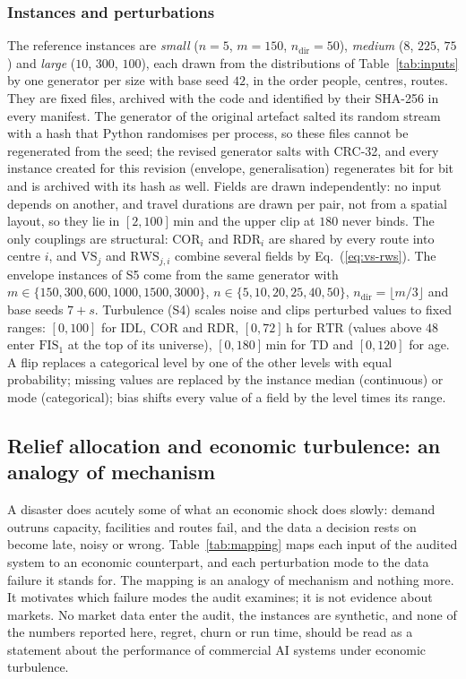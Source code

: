 \documentclass[systems,article,submit,moreauthors,pdftex]{Definitions/mdpi}
\begin{document}
\subsubsection{Instances and perturbations}
The reference instances are \emph{small} ($n=5$, $m=150$, $n_{\mathrm{dir}}=50$),
\emph{medium} ($8$, $225$, $75$) and \emph{large} ($10$, $300$, $100$), each drawn from the
distributions of Table~\ref{tab:inputs} by one generator per size with base seed $42$, in the
order people, centres, routes. They are fixed files, archived with the code and identified by
their SHA-256 in every manifest.
The generator of the original artefact salted its random stream with a hash that Python
randomises per process, so these files cannot be regenerated from the seed; the revised
generator salts with CRC-32, and every instance created for this revision (envelope,
generalisation) regenerates bit for bit and is archived with its hash as well.
Fields are drawn independently: no input
depends on another, and travel durations are drawn per pair, not from a spatial layout, so
they lie in $[2,100]$\,min and the upper clip at $180$ never binds. The only couplings are
structural: $\mathrm{COR}_i$ and $\mathrm{RDR}_i$ are shared by every route into centre $i$,
and $\mathrm{VS}_j$ and $\mathrm{RWS}_{j,i}$ combine several fields by
Eq.~(\ref{eq:vs-rws}). The envelope instances of S5 come from the same generator with
$m\in\{150,300,600,1000,1500,3000\}$, $n\in\{5,10,20,25,40,50\}$,
$n_{\mathrm{dir}}=\lfloor m/3\rfloor$ and base seeds $7+s$. Turbulence (S4) scales noise
and clips perturbed values to fixed ranges: $[0,100]$ for $\mathrm{IDL}$, $\mathrm{COR}$ and
$\mathrm{RDR}$, $[0,72]$\,h for $\mathrm{RTR}$ (values above $48$ enter $\mathrm{FIS}_1$ at the
top of its universe), $[0,180]$\,min for $\mathrm{TD}$ and $[0,120]$ for age. A flip replaces
a categorical level by one of the other levels with equal probability; missing values are
replaced by the instance median (continuous) or mode (categorical); bias shifts every value of a
field by the level times its range.

\subsection{Relief allocation and economic turbulence: an analogy of mechanism}
A disaster does acutely some of what an economic shock does slowly: demand outruns capacity,
facilities and routes fail, and the data a decision rests on become late, noisy or wrong.
Table~\ref{tab:mapping} maps each input of the audited system to an economic counterpart, and
each perturbation mode to the data failure it stands for. The mapping is an analogy of
mechanism and nothing more. It motivates which failure modes the audit examines; it is not
evidence about markets. No market data enter the audit, the instances are synthetic, and none
of the numbers reported here, regret, churn or run time, should be read as a statement about the
performance of commercial AI systems under economic turbulence.
\end{document}
